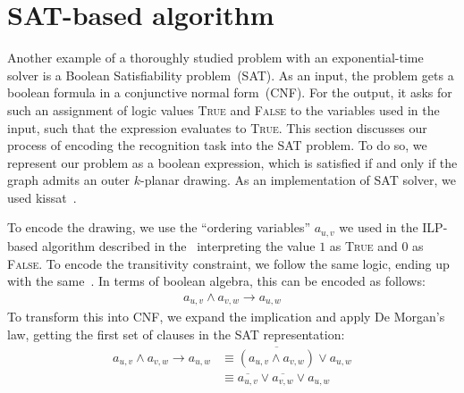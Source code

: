 \section{SAT-based algorithm}\label{sec:SAT-def}

Another example of a thoroughly studied problem with an exponential-time solver is a Boolean Satisfiability problem~(SAT). As an input, the problem gets a boolean formula in a conjunctive normal form~(CNF). For the output, it asks for such an assignment of logic values \textsc{True} and \textsc{False} to the variables used in the input, such that the expression evaluates to \textsc{True}. This section discusses our process of encoding the recognition task into the SAT problem. To do so, we represent our problem as a boolean expression, which is satisfied if and only if the graph admits an outer \(k\)-planar drawing. As an implementation of SAT solver, we used kissat~\cite{kissat, kissat-library}.

To encode the drawing, we use the ``ordering variables'' \(a_{u, v}\) we used in the ILP-based algorithm described in the~ interpreting the value \(1\) as \textsc{True} and \(0\) as \textsc{False}. To encode the transitivity constraint, we follow the same logic, ending up with the same~. In terms of boolean algebra, this can be encoded as follows:
\begin{align*}
    a_{u, v} \land a_{v, w} \rightarrow a_{u, w}
\end{align*}
To transform this into CNF, we expand the implication and apply De Morgan's law, getting the first set of clauses in the SAT representation:
\begin{align}
    a_{u, v} \land a_{v, w} \rightarrow a_{u, w}
    &\equiv \overline{(a_{u, v} \land a_{v, w})} \lor a_{u, w} \nonumber \\
    &\equiv \overline{a_{u, v}} \lor \overline{a_{v, w}} \lor a_{u, w} \label{sat:trans}
\end{align}

